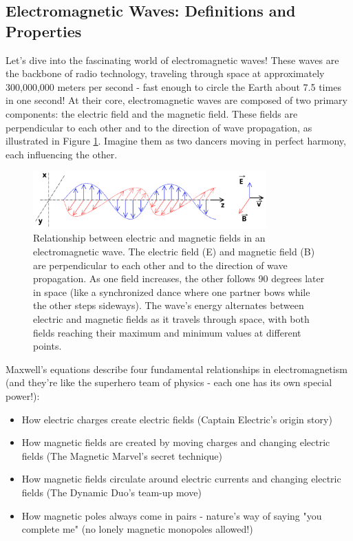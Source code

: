 \subsection{Electromagnetic Waves: Definitions and Properties}
\label{subsec:ac-basics2}

Let's dive into the fascinating world of electromagnetic waves! These waves are the backbone of radio technology, traveling through space at approximately 300,000,000 meters per second - fast enough to circle the Earth about 7.5 times in one second! At their core, electromagnetic waves are composed of two primary components: the electric field and the magnetic field. These fields are perpendicular to each other and to the direction of wave propagation, as illustrated in Figure \ref{fig:em-wave}. Imagine them as two dancers moving in perfect harmony, each influencing the other.

\begin{figure}[h]
    \centering
    \includegraphics[width=0.8\textwidth]{tech/images/em-wave.png}
    \caption{Relationship between electric and magnetic fields in an electromagnetic wave. The electric field (E) and magnetic field (B) are perpendicular to each other and to the direction of wave propagation. As one field increases, the other follows 90 degrees later in space (like a synchronized dance where one partner bows while the other steps sideways). The wave's energy alternates between electric and magnetic fields as it travels through space, with both fields reaching their maximum and minimum values at different points.}
    \label{fig:em-wave}
\end{figure}

Maxwell's equations describe four fundamental relationships in electromagnetism (and they're like the superhero team of physics - each one has its own special power!):
\begin{itemize}[noitemsep]
    \item How electric charges create electric fields (Captain Electric's origin story)
    \item How magnetic fields are created by moving charges and changing electric fields (The Magnetic Marvel's secret technique)
    \item How magnetic fields circulate around electric currents and changing electric fields (The Dynamic Duo's team-up move)
    \item How magnetic poles always come in pairs - nature's way of saying "you complete me" (no lonely magnetic monopoles allowed!)
\end{itemize}

